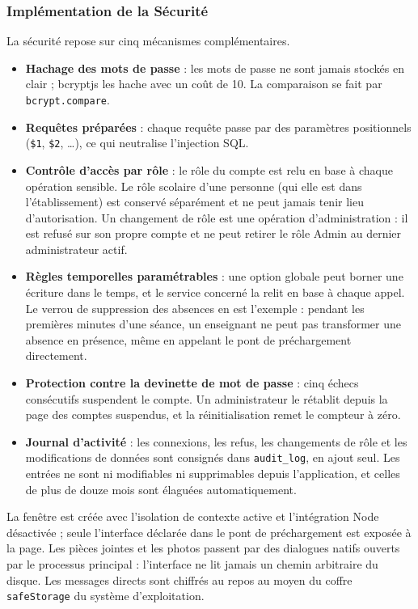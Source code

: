 \subsubsection{Implémentation de la Sécurité}
La sécurité repose sur cinq mécanismes complémentaires.
\begin{itemize}
    \item \textbf{Hachage des mots de passe} : les mots de passe ne sont jamais stockés en clair ;
          bcryptjs les hache avec un coût de 10. La comparaison se fait par \texttt{bcrypt.compare}.
    \item \textbf{Requêtes préparées} : chaque requête passe par des paramètres positionnels
          (\texttt{\$1}, \texttt{\$2}, \ldots), ce qui neutralise l'injection \ac{SQL}.
    \item \textbf{Contrôle d'accès par rôle} : le rôle du compte est relu en base à chaque opération
          sensible. Le rôle scolaire d'une personne (qui elle est dans l'établissement) est conservé
          séparément et ne peut jamais tenir lieu d'autorisation. Un changement de rôle est une
          opération d'administration : il est refusé sur son propre compte et ne peut retirer le rôle
          Admin au dernier administrateur actif.
    \item \textbf{Règles temporelles paramétrables} : une option globale peut borner une écriture dans le
          temps, et le service concerné la relit en base à chaque appel. Le verrou de suppression des
          absences en est l'exemple : pendant les premières minutes d'une séance, un enseignant ne peut
          pas transformer une absence en présence, même en appelant le pont de préchargement
          directement.
    \item \textbf{Protection contre la devinette de mot de passe} : cinq échecs consécutifs suspendent
          le compte. Un administrateur le rétablit depuis la page des comptes suspendus, et la
          réinitialisation remet le compteur à zéro.
    \item \textbf{Journal d'activité} : les connexions, les refus, les changements de rôle et les
          modifications de données sont consignés dans \texttt{audit\_log}, en ajout seul. Les entrées
          ne sont ni modifiables ni supprimables depuis l'application, et celles de plus de douze mois
          sont élaguées automatiquement.
\end{itemize}
La fenêtre est créée avec l'isolation de contexte active et l'intégration Node désactivée ; seule
l'interface déclarée dans le pont de préchargement est exposée à la page. Les pièces jointes et les
photos passent par des dialogues natifs ouverts par le processus principal : l'interface ne lit jamais
un chemin arbitraire du disque. Les messages directs sont chiffrés au repos au moyen du coffre
\texttt{safeStorage} du système d'exploitation.

